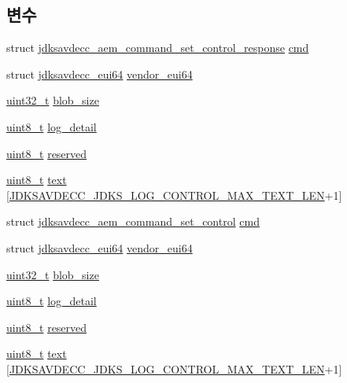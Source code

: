 \subsection*{변수}
\begin{DoxyCompactItemize}
\item 
struct \hyperlink{structjdksavdecc__aem__command__set__control__response}{jdksavdecc\+\_\+aem\+\_\+command\+\_\+set\+\_\+control\+\_\+response} \hyperlink{group__jdks_ga38de55b081b42c70b4caeb189e999cef}{cmd}
\item 
struct \hyperlink{structjdksavdecc__eui64}{jdksavdecc\+\_\+eui64} \hyperlink{group__jdks_ga6183c85748a8af0003d293d653c4ae9b}{vendor\+\_\+eui64}
\item 
\hyperlink{parse_8c_a6eb1e68cc391dd753bc8ce896dbb8315}{uint32\+\_\+t} \hyperlink{group__jdks_ga32143551b70893faef60f6e35f88ed50}{blob\+\_\+size}
\item 
\hyperlink{stdint_8h_aba7bc1797add20fe3efdf37ced1182c5}{uint8\+\_\+t} \hyperlink{group__jdks_ga61044f81305d515f41eea13f02f3cb81}{log\+\_\+detail}
\item 
\hyperlink{stdint_8h_aba7bc1797add20fe3efdf37ced1182c5}{uint8\+\_\+t} \hyperlink{group__jdks_gacb7bc06bed6f6408d719334fc41698c7}{reserved}
\item 
\hyperlink{stdint_8h_aba7bc1797add20fe3efdf37ced1182c5}{uint8\+\_\+t} \hyperlink{group__jdks_ga77513c59b654d8ce1e07a7f3bcdf70db}{text} \mbox{[}\hyperlink{group__jdks__log_gaaa43d62d581d06b4c563a3ac9f689730}{J\+D\+K\+S\+A\+V\+D\+E\+C\+C\+\_\+\+J\+D\+K\+S\+\_\+\+L\+O\+G\+\_\+\+C\+O\+N\+T\+R\+O\+L\+\_\+\+M\+A\+X\+\_\+\+T\+E\+X\+T\+\_\+\+L\+EN}+1\mbox{]}
\item 
struct \hyperlink{structjdksavdecc__aem__command__set__control}{jdksavdecc\+\_\+aem\+\_\+command\+\_\+set\+\_\+control} \hyperlink{group__jdks_ga0c878e1ddbac611b7218077c5c482cde}{cmd}
\item 
struct \hyperlink{structjdksavdecc__eui64}{jdksavdecc\+\_\+eui64} \hyperlink{group__jdks_ga6183c85748a8af0003d293d653c4ae9b}{vendor\+\_\+eui64}
\item 
\hyperlink{parse_8c_a6eb1e68cc391dd753bc8ce896dbb8315}{uint32\+\_\+t} \hyperlink{group__jdks_ga32143551b70893faef60f6e35f88ed50}{blob\+\_\+size}
\item 
\hyperlink{stdint_8h_aba7bc1797add20fe3efdf37ced1182c5}{uint8\+\_\+t} \hyperlink{group__jdks_ga61044f81305d515f41eea13f02f3cb81}{log\+\_\+detail}
\item 
\hyperlink{stdint_8h_aba7bc1797add20fe3efdf37ced1182c5}{uint8\+\_\+t} \hyperlink{group__jdks_gacb7bc06bed6f6408d719334fc41698c7}{reserved}
\item 
\hyperlink{stdint_8h_aba7bc1797add20fe3efdf37ced1182c5}{uint8\+\_\+t} \hyperlink{group__jdks_ga77513c59b654d8ce1e07a7f3bcdf70db}{text} \mbox{[}\hyperlink{group__jdks__log_gaaa43d62d581d06b4c563a3ac9f689730}{J\+D\+K\+S\+A\+V\+D\+E\+C\+C\+\_\+\+J\+D\+K\+S\+\_\+\+L\+O\+G\+\_\+\+C\+O\+N\+T\+R\+O\+L\+\_\+\+M\+A\+X\+\_\+\+T\+E\+X\+T\+\_\+\+L\+EN}+1\mbox{]}
\end{DoxyCompactItemize}


